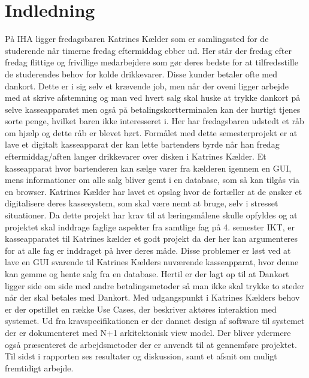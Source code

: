 \chapter{Indledning}
På \gls{IHA} ligger fredagsbaren Katrines Kælder som er samlingssted for de studerende når timerne 
fredag eftermiddag ebber ud. Her står der fredag efter fredag flittige og frivillige medarbejdere som gør deres bedste for at 
tilfredsstille de studerendes behov for kolde drikkevarer. Disse kunder betaler ofte med dankort. Dette er i sig selv et krævende job, men når der oveni ligger arbejde
med at skrive afstemning og man ved hvert salg skal huske at trykke dankort på selve kasseapparatet men også på betalingskortterminalen kan der hurtigt tjenes sorte penge, hvilket baren ikke interesseret i. 
Her har fredagsbaren udstedt et råb om hjælp og dette råb er blevet hørt. 
\newline
\newline
Formålet med dette semesterprojekt er at lave et digitalt kasseapparat der kan lette bartenders byrde når han fredag eftermiddag/aften langer drikkevarer over disken i Katrines Kælder. Et kasseapparat hvor bartenderen kan sælge varer fra kælderen igennem en GUI, mens informationer om alle salg bliver gemt i en database, som så kan tilgås via en browser.
\newline
\newline
Katrines Kælder har lavet et opslag hvor de fortæller at de ønsker et digitalisere deres kassesystem, som skal være nemt at bruge, selv i stresset situationer. Da dette projekt har krav til at læringsmålene skulle opfyldes og at projektet skal inddrage faglige aspekter fra samtlige fag på 4. semester IKT, er kasseapparatet til Katrines kælder et godt projekt da der her kan argumenteres for at alle fag er inddraget på hver deres måde.
\newline
\newline
Disse problemer er løst ved at lave en GUI svarende til Katrines Kælders nuværende kasseapparat, hvor denne kan gemme og hente salg fra en database. Hertil er der lagt op til at Dankort ligger side om side med andre betalingsmetoder så man ikke skal trykke to steder når der skal betales med Dankort. 
\newline
\newline
Med udgangspunkt i Katrines Kælders behov er der opstillet en række Use Cases, der beskriver aktøres interaktion med systemet. Ud fra kravspecifikationen er der dannet design af software til systemet der er dokumenteret med N+1 arkitektonisk view model. Der bliver ydermere også præsenteret de arbejdsmetoder der er anvendt til at gennemføre projektet. Til sidst i rapporten ses resultater og diskussion, samt et afsnit om muligt fremtidigt arbejde. 